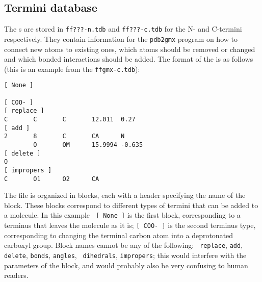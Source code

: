 \subsection{Termini database}
\label{subsec:tdb}
The s are stored in {\tt ff???-n.tdb} and
{\tt ff???-c.tdb} for the N- and C-termini respectively. They contain
information for the {\tt pdb2gmx} program on how to connect new atoms
to existing ones, which atoms should be removed or changed and which
bonded interactions should be added. The format of the is as follows
(this is an example from the {\tt ffgmx-c.tdb}):
%
{\small\begin{verbatim}
[ None ]

[ COO- ]
[ replace ]
C       C       C       12.011  0.27
[ add ]
2       8       C       CA      N
        O       OM      15.9994 -0.635
[ delete ]
O
[ impropers ]
C       O1      O2      CA
\end{verbatim}
}

The file is organized in blocks, each with a header specifying the
name of the block. These blocks correspond to different types of
termini that can be added to a molecule. In this example {\tt
[~None~]} is the first block, corresponding to a terminus that leaves
the molecule as it is; {\tt [~COO-~]} is the second terminus type,
corresponding to changing the terminal carbon atom into a deprotonated
carboxyl group. Block names cannot be any of the following: {\tt
replace}, {\tt add}, {\tt delete}, {\tt bonds}, {\tt angles}, {\tt
dihedrals}, {\tt impropers}; this would interfere with the parameters
of the block, and would probably also be very confusing to human
readers.

